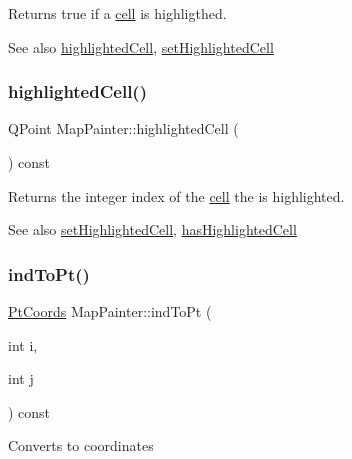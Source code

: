 Returns true if a \hyperlink{class_cell}{cell} is highligthed.

\begin{DoxySeeAlso}{See also}
\hyperlink{class_map_painter_a61c6dc7ea2173b51e8164b55bf7c8f53}{highlighted\+Cell}, \hyperlink{class_map_painter_ad7effe1c69fb1409d696dd54edd8bbb3}{set\+Highlighted\+Cell} 
\end{DoxySeeAlso}
\hypertarget{class_map_painter_a61c6dc7ea2173b51e8164b55bf7c8f53}{}\label{class_map_painter_a61c6dc7ea2173b51e8164b55bf7c8f53} 
\subsubsection{\texorpdfstring{highlighted\+Cell()}{highlightedCell()}}
{\footnotesize\ttfamily Q\+Point Map\+Painter\+::highlighted\+Cell (\begin{DoxyParamCaption}{ }\end{DoxyParamCaption}) const}

Returns the integer index of the \hyperlink{class_cell}{cell} the is highlighted.

\begin{DoxySeeAlso}{See also}
\hyperlink{class_map_painter_ad7effe1c69fb1409d696dd54edd8bbb3}{set\+Highlighted\+Cell}, \hyperlink{class_map_painter_a8d2bdf48a8b1fc578a5b9436ad78307e}{has\+Highlighted\+Cell} 
\end{DoxySeeAlso}
\hypertarget{class_map_painter_abe8b05f2893cedd9610b5c53b69a4530}{}\label{class_map_painter_abe8b05f2893cedd9610b5c53b69a4530} 
\subsubsection{\texorpdfstring{ind\+To\+Pt()}{indToPt()}}
{\footnotesize\ttfamily \hyperlink{class_pt_coords}{Pt\+Coords} Map\+Painter\+::ind\+To\+Pt (\begin{DoxyParamCaption}\item[{int}]{i,  }\item[{int}]{j }\end{DoxyParamCaption}) const}

Converts to coordinates \hypertarget{class_map_painter_ad7582541fbc927d0d82169f9dcd22767}{}\label{class_map_painter_ad7582541fbc927d0d82169f9dcd22767} 
